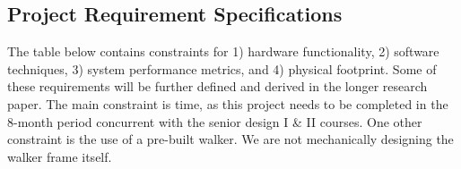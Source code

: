\subsection{Project Requirement Specifications}
\noindent The table below contains constraints for 1) hardware functionality, 2) software techniques, 3) system performance metrics, and 4) physical footprint. Some of these requirements will be further defined and derived in the longer research paper. The main constraint is time, as this project needs to be completed in the 8-month period concurrent with the senior design I \& II courses. One other constraint is the use of a pre-built walker. We are not mechanically designing the walker frame itself.

